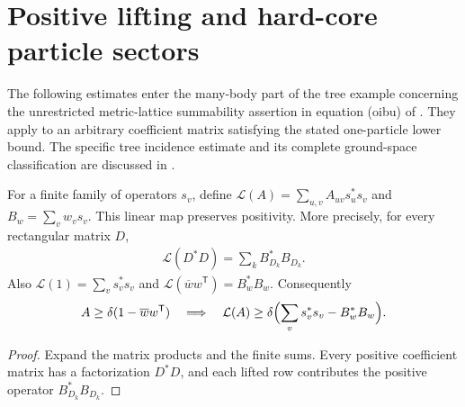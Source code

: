 \section{Positive lifting and hard-core particle sectors}
\label{sec:hastings05_tree_sector_gap}

The following estimates enter the many-body part of the tree example
concerning the unrestricted metric-lattice summability assertion in equation
(oibu) of \cite[lines 1690--1694]{Hastings2006Solving}. They apply to an
arbitrary coefficient matrix satisfying the stated one-particle lower bound.
The specific tree incidence estimate and its complete ground-space
classification are discussed in \cite{gap:hastings05_tree_basis_counterexample}.

\begin{lemma}
    \label{thm:hastings05_positive_quadratic_lift}
    \leanok
    For a finite family of operators $s_v$, define
    $\mathcal L(A)=\sum_{u,v}A_{uv}s_u^*s_v$ and
    $B_w=\sum_vw_vs_v$. This linear map preserves positivity. More
    precisely, for every rectangular matrix $D$,
    \begin{align*}
        \mathcal L(D^*D)=\sum_k B_{D_k}^*B_{D_k}.
    \end{align*}
    Also $\mathcal L(1)=\sum_vs_v^*s_v$ and
    $\mathcal L(\overline w w^{\mathsf T})=B_w^*B_w$.
    Consequently
    \begin{align*}
        A\ge\delta(1-\overline w w^{\mathsf T})
        \quad\Longrightarrow\quad
        \mathcal L(A)\ge\delta\Bigl(\sum_vs_v^*s_v-B_w^*B_w\Bigr).
    \end{align*}
\end{lemma}
\begin{proof}\leanok
    Expand the matrix products and the finite sums. Every positive
    coefficient matrix has a factorization $D^*D$, and each lifted
    row contributes the positive operator $B_{D_k}^*B_{D_k}$.
\end{proof}

